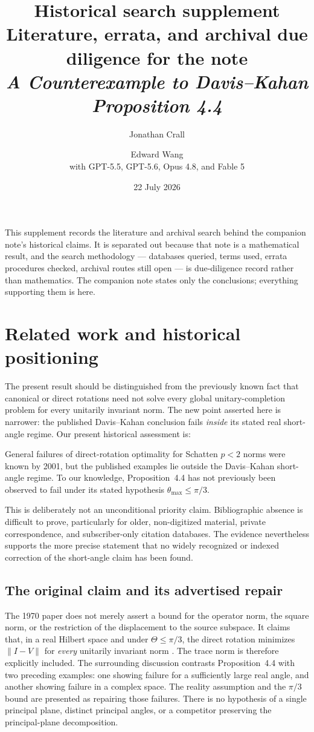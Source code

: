\documentclass[11pt]{article}
\title{\textbf{Historical search supplement}\\[0.4em]
\large Literature, errata, and archival due diligence for the note\\
\emph{A Counterexample to Davis--Kahan Proposition 4.4}}
\author{Jonathan Crall \and Edward Wang\\[0.5em]
\normalsize with GPT-5.5, GPT-5.6, Opus 4.8, and Fable 5}
\date{22 July 2026}
\begin{document}
\maketitle

This supplement records the literature and archival search behind the companion
note's historical claims.  It is separated out because that note is a
mathematical result, and the search methodology --- databases queried, terms
used, errata procedures checked, archival routes still open --- is due-diligence
record rather than mathematics.  The companion note states only the conclusions;
everything supporting them is here.

\section{Related work and historical positioning}
\label{sec:related}

The present result should be distinguished from the previously known fact that
canonical or direct rotations need not solve every global unitary-completion
problem for every unitarily invariant norm.  The new point asserted here is
narrower: the published Davis--Kahan conclusion fails \emph{inside} its stated
real short-angle regime.  Our present historical assessment is:

\begin{statusbox}
General failures of direct-rotation optimality for Schatten $p<2$ norms were
known by 2001, but the published examples lie outside the Davis--Kahan
short-angle regime.  To our knowledge, Proposition~4.4 has not previously been
observed to fail under its stated hypothesis
$\theta_{\max}\leq\pi/3$.
\end{statusbox}

This is deliberately not an unconditional priority claim.  Bibliographic
absence is difficult to prove, particularly for older, non-digitized material,
private correspondence, and subscriber-only citation databases.  The evidence
nevertheless supports the more precise statement that no widely recognized or
indexed correction of the short-angle claim has been found.

\subsection{The original claim and its advertised repair}

The 1970 paper does not merely assert a bound for the operator norm, the square
norm, or the restriction of the displacement to the source subspace.  It claims
that, in a real Hilbert space and under $\Theta\leq\pi/3$, the direct rotation
minimizes $\lVert I-V\rVert$ for \emph{every} unitarily invariant norm
\cite{DavisKahan1970}.  The trace norm is therefore explicitly included.  The
surrounding discussion contrasts Proposition~4.4 with two preceding examples:
one showing failure for a sufficiently large real angle, and another showing
failure in a complex space.  The reality assumption and the $\pi/3$ bound are
presented as repairing those failures.  There is no hypothesis of a single
principal plane, distinct principal angles, or a competitor preserving the
principal-plane decomposition.
\end{document}
